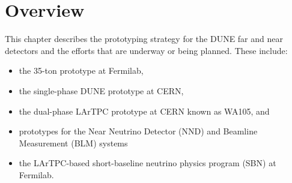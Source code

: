 \section{Overview}
\label{sec:proto-overview}


This chapter describes the prototyping strategy for the DUNE  far and near detectors and the efforts that are underway or being planned.  These include:
\begin{itemize}
\item the 35-ton prototype at Fermilab,
\item the single-phase DUNE prototype at CERN,
\item the dual-phase LArTPC prototype at CERN known as WA105, and
\item prototypes for the Near Neutrino Detector (NND) and Beamline Measurement (BLM) systems
\item the LArTPC-based short-baseline neutrino physics program (SBN) at Fermilab.
\end{itemize}

